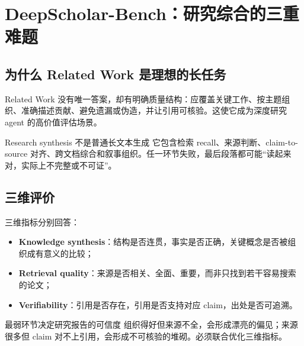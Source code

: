 \section{DeepScholar-Bench：研究综合的三重难题}

\subsection{为什么 Related Work 是理想的长任务}



Related Work 没有唯一答案，却有明确质量结构：应覆盖关键工作、按主题组织、准确描述贡献、避免遗漏或伪造，并让引用可核验。这使它成为深度研究 agent 的高价值评估场景。

\begin{knowledgebox}{Research synthesis 不是普通长文本生成}
它包含检索 recall、来源判断、claim-to-source 对齐、跨文档综合和叙事组织。任一环节失败，最后段落都可能“读起来对，实际上不完整或不可证”。
\end{knowledgebox}

\subsection{三维评价}


三维指标分别回答：

\begin{itemize}
    \item \textbf{Knowledge synthesis}：结构是否连贯，事实是否正确，关键概念是否被组织成有意义的比较；
    \item \textbf{Retrieval quality}：来源是否相关、全面、重要，而非只找到若干容易搜索的论文；
    \item \textbf{Verifiability}：引用是否存在，引用是否支持对应 claim，出处是否可追溯。
\end{itemize}


\begin{importantbox}{最弱环节决定研究报告的可信度}
组织得好但来源不全，会形成漂亮的偏见；来源很多但 claim 对不上引用，会形成不可核验的堆砌。必须联合优化三维指标。
\end{importantbox}

